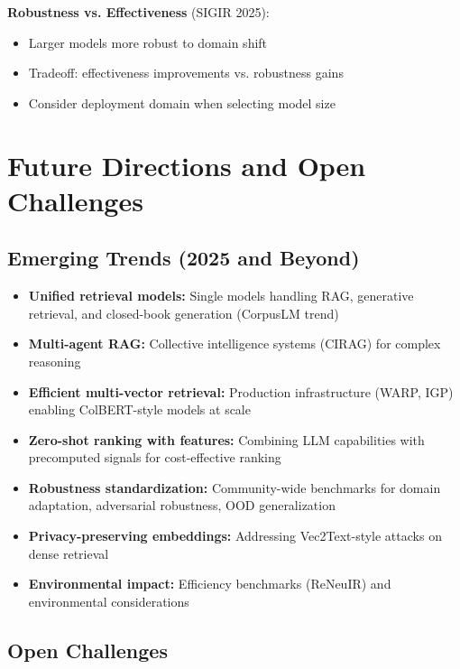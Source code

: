 \documentclass[11pt,letterpaper]{article}
\begin{document}
\textbf{Robustness vs. Effectiveness} (SIGIR 2025):
\begin{itemize}[leftmargin=*]
    \item Larger models more robust to domain shift
    \item Tradeoff: effectiveness improvements vs. robustness gains
    \item Consider deployment domain when selecting model size
\end{itemize}

\section{Future Directions and Open Challenges}

\subsection{Emerging Trends (2025 and Beyond)}

\begin{itemize}[leftmargin=*]
    \item \textbf{Unified retrieval models:} Single models handling RAG, generative retrieval, and closed-book generation (CorpusLM trend)

    \item \textbf{Multi-agent RAG:} Collective intelligence systems (CIRAG) for complex reasoning

    \item \textbf{Efficient multi-vector retrieval:} Production infrastructure (WARP, IGP) enabling ColBERT-style models at scale

    \item \textbf{Zero-shot ranking with features:} Combining LLM capabilities with precomputed signals for cost-effective ranking

    \item \textbf{Robustness standardization:} Community-wide benchmarks for domain adaptation, adversarial robustness, OOD generalization

    \item \textbf{Privacy-preserving embeddings:} Addressing Vec2Text-style attacks on dense retrieval

    \item \textbf{Environmental impact:} Efficiency benchmarks (ReNeuIR) and environmental considerations
\end{itemize}

\subsection{Open Challenges}
\end{document}
